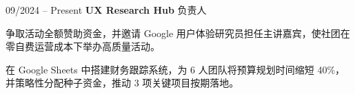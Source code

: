 \begin{twocolentry}{09/2024 – Present} \textbf{UX Research Hub} 
    \newline 负责人 \end{twocolentry}
\begin{onecolentry}
\begin{highlights}
\item 争取活动全额赞助资金，并邀请 Google 用户体验研究员担任主讲嘉宾，使社团在零自费运营成本下举办高质量活动。
\item 在 Google Sheets 中搭建财务跟踪系统，为 6 人团队将预算规划时间缩短 40\%，并策略性分配种子资金，推动 3 项关键项目按期落地。
\end{highlights}
\end{onecolentry}
